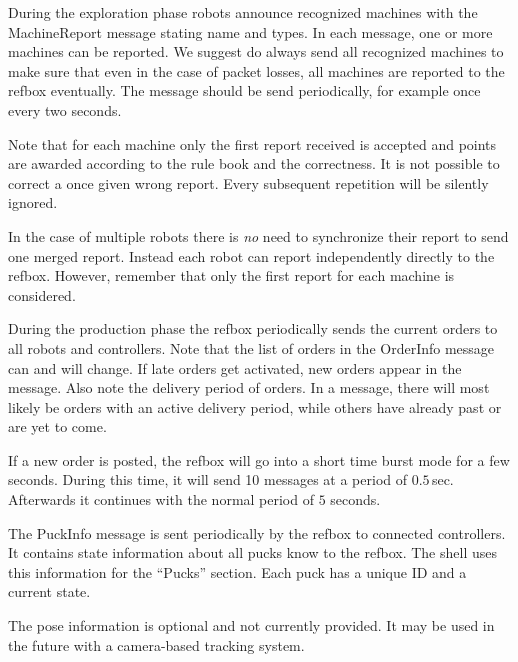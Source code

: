 \documentclass[a4paper]{article}
\begin{document}
%
{%
  During the exploration phase robots announce recognized machines
  with the MachineReport message stating name and types. In each
  message, one or more machines can be reported. We suggest do always
  send all recognized machines to make sure that even in the case of
  packet losses, all machines are reported to the refbox
  eventually. The message should be send periodically, for example
  once every two seconds.

  \medskip

  Note that for each machine only the first report received is
  accepted and points are awarded according to the rule book and the
  correctness. It is not possible to correct a once given wrong
  report. Every subsequent repetition will be silently ignored.

  \medskip

  In the case of multiple robots there is \emph{no} need to
  synchronize their report to send one merged report. Instead each
  robot can report independently directly to the refbox. However,
  remember that only the first report for each machine is considered.

}

%
{%
  During the production phase the refbox periodically sends the
  current orders to all robots and controllers. Note that the list of
  orders in the OrderInfo message can and will change. If late orders
  get activated, new orders appear in the message. Also note the
  delivery period of orders. In a message, there will most likely be
  orders with an active delivery period, while others have already
  past or are yet to come.

  \medskip

  If a new order is posted, the refbox will go into a short time burst
  mode for a few seconds. During this time, it will send 10 messages
  at a period of $0.5$\,sec. Afterwards it continues with the normal
  period of $5$ seconds.
}

%
{%
  The PuckInfo message is sent periodically by the refbox to connected
  controllers. It contains state information about all pucks know to
  the refbox. The shell uses this information for the ``Pucks''
  section. Each puck has a unique ID and a current state.

  \medskip

  The pose information is optional and not currently provided. It may
  be used in the future with a camera-based tracking system.
}
\end{document}

